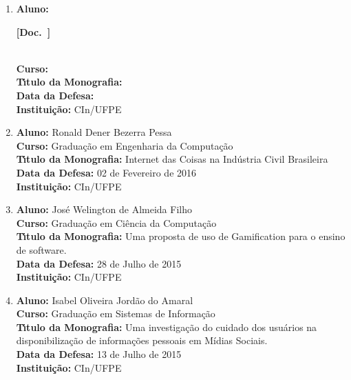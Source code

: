\documentclass[a4paper,oneside,10pt]{article}
\newcounter{document}%
\newcommand\Doc{{\addtocounter{document}{1}\mbox{\sffamily\bfseries [Doc. \arabic{document}]}}}
\begin{document}
\begin{enumerate}
\renewcommand{\labelenumi}{{\large\bfseries\arabic{enumi}.}}

\item       \textbf{Aluno:}  \Doc \\
            \textbf{Curso:} \\
            \textbf{T\'{\i}tulo da Monografia:} \\
            \textbf{Data da Defesa:} \\
            \textbf{Institui\c{c}\~{a}o:} CIn/UFPE

\item       \textbf{Aluno:}  Ronald Dener Bezerra Pessa \mbox{}\\
            \textbf{Curso:} Graduação em Engenharia da Computação \\
            \textbf{T\'{\i}tulo da Monografia:} Internet das Coisas na Indústria Civil Brasileira\\
            \textbf{Data da Defesa:} 02 de Fevereiro de 2016\\
            \textbf{Institui\c{c}\~{a}o:} CIn/UFPE

\item       \textbf{Aluno:} José Welington de Almeida Filho \mbox{}\\
            \textbf{Curso:} Graduação em Ciência da Computação\\
            \textbf{T\'{\i}tulo da Monografia:} Uma proposta de uso de Gamification para o ensino de software.\\
            \textbf{Data da Defesa:} 28 de Julho de 2015\\
            \textbf{Institui\c{c}\~{a}o:} CIn/UFPE

\item       \textbf{Aluno:} Isabel Oliveira Jordão do Amaral \mbox{}\\
            \textbf{Curso:} Graduação em Sistemas de Informação\\
            \textbf{T\'{\i}tulo da Monografia:} Uma investigação do cuidado dos usuários na disponibilização de informações pessoais em Mídias Sociais.\\
            \textbf{Data da Defesa:} 13 de Julho de 2015\\
            \textbf{Institui\c{c}\~{a}o:} CIn/UFPE


\end{enumerate}
\end{document}
